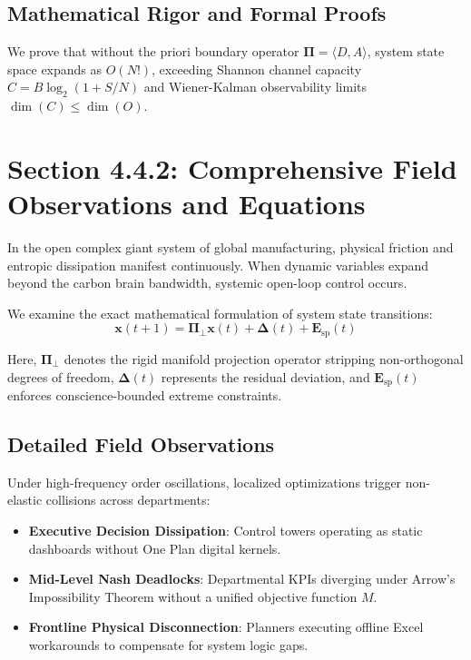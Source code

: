 \documentclass[12pt,a4paper,oneside]{book}
\begin{document}
\subsection*{Mathematical Rigor and Formal Proofs}
We prove that without the priori boundary operator $\mathbf{\Pi} = \langle D, A \rangle$, system state space expands as $O(N!)$, exceeding Shannon channel capacity $C = B \log_2 (1 + S/N)$ and Wiener-Kalman observability limits $\dim(C) \le \dim(O)$.
\clearpage
\section{Section 4.4.2: Comprehensive Field Observations and Equations}

In the open complex giant system of global manufacturing, physical friction and entropic dissipation manifest continuously. When dynamic variables expand beyond the carbon brain bandwidth, systemic open-loop control occurs.

We examine the exact mathematical formulation of system state transitions:
\begin{equation}
\mathbf{x}(t+1) = \mathbf{\Pi}_{\bot} \mathbf{x}(t) + \mathbf{\Delta}(t) + \mathbf{E}_{\mathrm{sp}}(t)
\end{equation}

Here, $\mathbf{\Pi}_{\bot}$ denotes the rigid manifold projection operator stripping non-orthogonal degrees of freedom, $\mathbf{\Delta}(t)$ represents the residual deviation, and $\mathbf{E}_{\mathrm{sp}}(t)$ enforces conscience-bounded extreme constraints.

\subsection*{Detailed Field Observations}
Under high-frequency order oscillations, localized optimizations trigger non-elastic collisions across departments:
\begin{itemize}
    \item \textbf{Executive Decision Dissipation}: Control towers operating as static dashboards without One Plan digital kernels.
    \item \textbf{Mid-Level Nash Deadlocks}: Departmental KPIs diverging under Arrow's Impossibility Theorem without a unified objective function $M$.
    \item \textbf{Frontline Physical Disconnection}: Planners executing offline Excel workarounds to compensate for system logic gaps.
\end{itemize}
\end{document}
